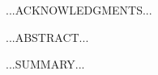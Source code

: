 \documentclass[a4paper, 12pt, oneside]{report}         %
\begin{document}
\thesistitlepage                                  %

\thesisdeclarationpage                %

\thesispermissionpage                 %


\begin{thesisacknowledgments}                     %
...ACKNOWLEDGMENTS...                          %
\end{thesisacknowledgments}                       %

\begin{thesisabstract}                          %
...ABSTRACT...
\end{thesisabstract}

\begin{thesissummary}                           %
...SUMMARY...	
\end{thesissummary}


\tableofcontents                                  %
\listoftables                                     %
\listoffigures                                    %

  
  
  
  
  
  

\begin{thebibliography}{ieeetr}                   %
\end{thebibliography}                             %


\begin{appendix}
 
% 
\end{appendix}


\end{document}
